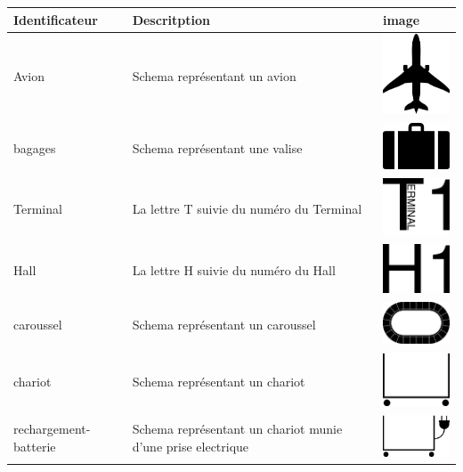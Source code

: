 \begin{longtable}{|m{3cm}|m{9cm}|m{2.5cm}|}
\hline
Identificateur & Descritption & image \\
\hline
Avion  & Schema représentant un avion & \includegraphics[width=2.5cm]{img/Avion.pdf} \\
\hline
bagages  & Schema représentant une valise & \includegraphics[width=2.5cm]{img/bagages.pdf} \\
\hline
Terminal  & La lettre T suivie du numéro du Terminal & \includegraphics[width=2.5cm]{img/Terminal.pdf} \\
\hline
Hall  & La lettre H suivie du numéro du Hall & \includegraphics[width=2.5cm]{img/Hall.pdf} \\
\hline
caroussel  & Schema représentant un caroussel & \includegraphics[width=2.5cm]{img/caroussel.pdf} \\
\hline
chariot  & Schema représentant un chariot & \includegraphics[width=2.5cm]{img/chariot.pdf} \\
\hline
rechargement-batterie  & Schema représentant un chariot munie d'une prise electrique & \includegraphics[width=2.5cm]{img/rechargement-batterie.pdf} \\

\end{longtable}
